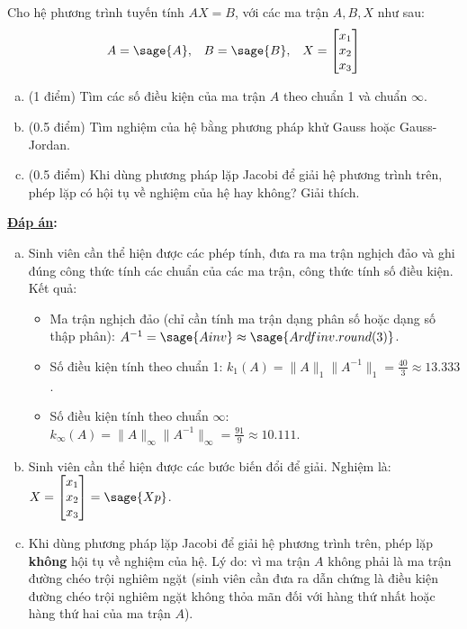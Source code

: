 \documentclass[12pt]{article}
\newcommand{\Solution}{
\medskip
{\bf \underline{Đáp án}:}
}
\begin{document}
Cho hệ phương trình tuyến tính $AX=B$, với các ma trận $A, B, X$ như sau:
\begin{equation}
 \begin{array}{ccc}
  A = \sage{A}, & B = \sage{B}, & X = \begin{bmatrix}x_1\\x_2\\x_3\end{bmatrix}
 \end{array}
\end{equation}
\begin{enumerate}[a).]
 \item (1 điểm) Tìm các số điều kiện của ma trận $A$ theo chuẩn 1 và chuẩn $\infty$.
 \item (0.5 điểm) Tìm nghiệm của hệ bằng phương pháp khử Gauss hoặc Gauss-Jordan.
 \item (0.5 điểm) Khi dùng phương pháp lặp Jacobi để giải hệ phương trình trên, phép lặp có hội tụ về nghiệm của hệ hay không? Giải thích.
\end{enumerate}

\Solution

\begin{enumerate}[a)]
 \item Sinh viên cần thể hiện được các phép tính, đưa ra ma trận nghịch đảo và ghi đúng công thức tính các chuẩn của các ma trận, công thức tính số điều kiện. Kết quả: 
 \begin{itemize}
  \item Ma trận nghịch đảo (chỉ cần tính ma trận dạng phân số hoặc dạng số thập phân): $A^{-1} = \sage{Ainv} \approx \sage{Ardfinv.round(3)}$.
  \item Số điều kiện tính theo chuẩn 1:  $k_1(A)=\|A\|_1 \|A^{-1}\|_1=\frac{40}{3}\approx 13.333$.
  \item Số điều kiện tính theo chuẩn $\infty$:  $k_{\infty}(A)=\|A\|_{\infty} \|A^{-1}\|_{\infty}=\frac{91}{9}\approx 10.111$.
 \end{itemize}
 \item Sinh viên cần thể hiện được các bước biến đổi để giải. Nghiệm là: $X=\begin{bmatrix}x_1\\x_2\\x_3\end{bmatrix}=\sage{Xp}$.
 \item Khi dùng phương pháp lặp Jacobi để giải hệ phương trình trên, phép lặp \textbf{không} hội tụ về nghiệm của hệ. Lý do: vì ma trận $A$ không phải là ma trận đường chéo trội nghiêm ngặt (sinh viên cần đưa ra dẫn chứng là điều kiện đường chéo trội nghiêm ngặt không thỏa mãn đối với hàng thứ nhất hoặc hàng thứ hai của ma trận $A$).
\end{enumerate}
\end{document}
